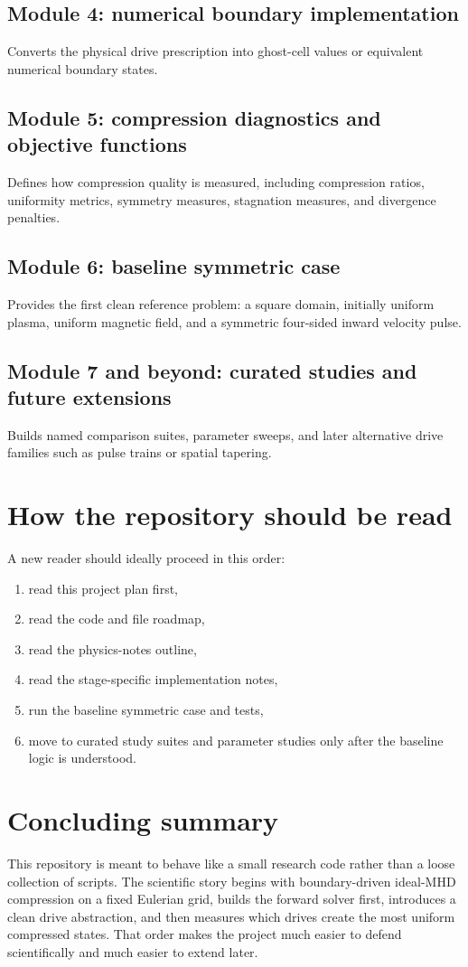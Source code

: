 \documentclass[11pt]{article}
\begin{document}
\subsection{Module 4: numerical boundary implementation}
Converts the physical drive prescription into ghost-cell values or equivalent numerical boundary states.

\subsection{Module 5: compression diagnostics and objective functions}
Defines how compression quality is measured, including compression ratios, uniformity metrics, symmetry measures, stagnation measures, and divergence penalties.

\subsection{Module 6: baseline symmetric case}
Provides the first clean reference problem: a square domain, initially uniform plasma, uniform magnetic field, and a symmetric four-sided inward velocity pulse.

\subsection{Module 7 and beyond: curated studies and future extensions}
Builds named comparison suites, parameter sweeps, and later alternative drive families such as pulse trains or spatial tapering.

\section{How the repository should be read}
A new reader should ideally proceed in this order:
\begin{enumerate}[leftmargin=1.8em]
    \item read this project plan first,
    \item read the code and file roadmap,
    \item read the physics-notes outline,
    \item read the stage-specific implementation notes,
    \item run the baseline symmetric case and tests,
    \item move to curated study suites and parameter studies only after the baseline logic is understood.
\end{enumerate}

\section{Concluding summary}
This repository is meant to behave like a small research code rather than a loose collection of scripts. The scientific story begins with boundary-driven ideal-MHD compression on a fixed Eulerian grid, builds the forward solver first, introduces a clean drive abstraction, and then measures which drives create the most uniform compressed states. That order makes the project much easier to defend scientifically and much easier to extend later.
\end{document}
